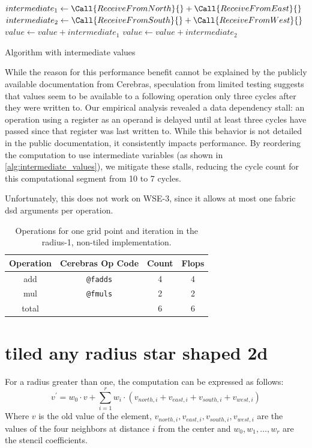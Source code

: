 \begin{algorithm}[tbh]
    \SetAlgoLined
    $intermediate_1 \gets \Call{ReceiveFromNorth}{} + \Call{ReceiveFromEast}{}$\;
    $intermediate_2 \gets \Call{ReceiveFromSouth}{} + \Call{ReceiveFromWest}{}$\;
    $value \gets value + intermediate_1$\;
    $value \gets value + intermediate_2$\;
    \caption{Algorithm with intermediate values}\label{alg:intermediate_values}
\end{algorithm}

While the reason for this performance benefit cannot be explained by the publicly available documentation from Cerebras, speculation from limited testing suggests that values seem to be available to a following operation only three cycles after they were written to.
Our empirical analysis revealed a data dependency stall: an operation using a register as an operand is delayed until at least three cycles have passed since that register was last written to. While this behavior is not detailed in the public documentation, it consistently impacts performance. By reordering the computation to use intermediate variables (as shown in \autoref{alg:intermediate_values}), we mitigate these stalls, reducing the cycle count for this computational segment from 10 to 7 cycles.

Unfortunately, this does not work on WSE-3, since it allows at most one fabric \ac{dsd} arguments per operation.

\begin{table}[h]
    \centering
    \caption{Operations for one grid point and iteration in the radius-1, non-tiled implementation.}
    \label{tab:r1_non_tiled_operations}
    \begin{tabular}{@{}cccc@{}}
        \toprule
        Operation & Cerebras Op Code & Count & Flops \\
        \midrule
        add & \texttt{@fadds} & \num{4} & \num{4} \\
        mul & \texttt{@fmuls} & \num{2} & \num{2} \\
        \midrule
        total & & \num{6} & \num{6} \\
        \bottomrule
    \end{tabular}
\end{table}

\section{tiled any radius star shaped 2d}
For a radius greater than one, the computation can be expressed as follows:
\begin{equation}
    \label{eq:stencil_computation_tiled}
    v^{'} = w_0 \cdot v + \sum_{i=1}^{r} w_i \cdot (v_{north,i} + v_{east,i} + v_{south,i} + v_{west,i})
\end{equation}
Where $v$ is the old value of the element, $v_{north,i}, v_{east,i}, v_{south,i}, v_{west,i}$ are the values of the four neighbors at distance $i$ from the center and $w_0, w_1, \dots, w_r$ are the stencil coefficients.

